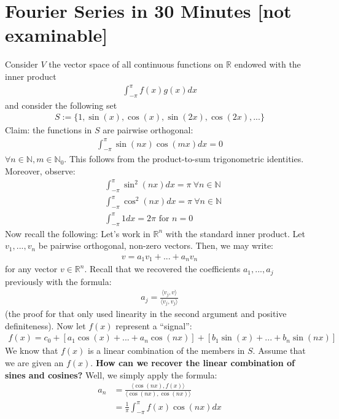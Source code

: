 \documentclass[11pt]{scrartcl}
\newcommand{\R}[0]{\mathbb{R}}
\theoremstyle{definition}
\theoremstyle{remark}
\newcommand{\N}[0]{\mathbb{N}}
\begin{document}
\section{Fourier Series in 30 Minutes [not examinable]}
Consider $V$ the vector space of all continuous functions on $\R$ endowed with the inner product
\begin{align}
	\int_{-\pi}^\pi f(x) g(x) dx	
\end{align}
and consider the following set
\begin{align}
	S := \{ 1, \sin (x) , \cos(x), \sin(2x), \cos(2x), ... \} 	
\end{align}
Claim: the functions in $S$ are pairwise orthogonal: 
\begin{align}
	\int_{- \pi}^\pi \sin (nx) \cos(mx) dx = 0 	
\end{align}
$\forall n \in \N, m \in \N_0$. This follows from the product-to-sum trigonometric identities. Moreover, observe: 
\begin{align}
	& \int_{-\pi}^\pi \sin^2 (nx) dx = \pi\ \forall n \in \N \\
	& \int_{-\pi}^\pi \cos^2 (nx ) dx = \pi\ \forall n \in \N \\
	& \int_{-\pi}^\pi 1 dx = 2 \pi \text{ for } n = 0
\end{align}
Now recall the following: Let's work in $\R^n $ with the standard inner product. Let $v_1, ..., v_n$ be pairwise orthogonal, non-zero vectors. Then, we may write: 
\begin{align}
	v = a_1 v_1 +... + a_n v_n 	
\end{align}
for any vector $v \in \R^n$. Recall that we recovered the coefficients $a_1, ..., a_j$ previously with the formula: 
\begin{align}
	a_j = \frac{\langle v_j, v \rangle}{\langle v_j , v_j \rangle}	
\end{align}
(the proof for that only used linearity in the second argument and positive definiteness). Now let $f(x)$ represent a ``signal'': 
\begin{align}
	f(x ) = c_0 + [ a_1 \cos(x) + ... + a_n \cos (nx) ] + [b_1 \sin(x) + ... + b_n \sin (nx) ] 
\end{align}
We know that $f(x) $ is a linear combination of the members in $S$. Assume that we are given an $f(x)$. \textbf{How can we recover the linear combination of sines and cosines?} Well, we simply apply the formula: 
\begin{align}
	a_n & = \frac{\langle \cos(nx), f(x) \rangle}{\langle \cos(nx), \cos(nx) \rangle}	\\
	& = \frac{1}{\pi} \int_{-\pi}^\pi f(x) \cos (nx) dx 
\end{align}
\end{document}
